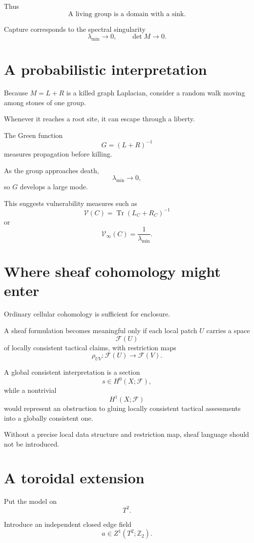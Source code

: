\documentclass[11pt]{article}
\begin{document}
Thus
\[
\boxed{
\text{A living group is a domain with a sink.}
}
\]

Capture corresponds to the spectral singularity
\[
\lambda_{\min}\to0,
\qquad
\det M\to0.
\]

\section{A probabilistic interpretation}

Because \(M=L+R\) is a killed graph Laplacian, consider a random walk moving among stones of one group.

Whenever it reaches a root site, it can escape through a liberty.

The Green function
\[
G=(L+R)^{-1}
\]
measures propagation before killing.

As the group approaches death,
\[
\lambda_{\min}\to0,
\]
so \(G\) develops a large mode.

This suggests vulnerability measures such as
\[
\boxed{
\mathcal V(C)
=
\operatorname{Tr}(L_C+R_C)^{-1}
}
\]
or
\[
\mathcal V_\infty(C)
=
\frac1{\lambda_{\min}}.
\]

\section{Where sheaf cohomology might enter}

Ordinary cellular cohomology is sufficient for enclosure.

A sheaf formulation becomes meaningful only if each local patch \(U\) carries a space
\[
\mathcal F(U)
\]
of locally consistent tactical claims, with restriction maps
\[
\rho_{UV}:\mathcal F(U)\to\mathcal F(V).
\]

A global consistent interpretation is a section
\[
s\in H^0(X;\mathcal F),
\]
while a nontrivial
\[
H^1(X;\mathcal F)
\]
would represent an obstruction to gluing locally consistent tactical assessments into a globally consistent one.

Without a precise local data structure and restriction map, sheaf language should not be introduced.

\section{A toroidal extension}

Put the model on
\[
T^2.
\]

Introduce an independent closed edge field
\[
a\in Z^1(T^2;\mathbb Z_2).
\]
\end{document}
